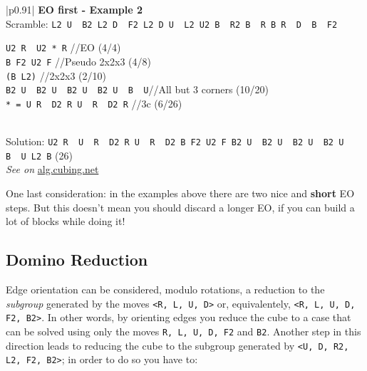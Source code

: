 \documentclass[11pt,a4paper]{book}
\newcommand{\p}{\textquotesingle}
\newcommand{\m}{\texttt}
\newcommand{\ps}{\p\,\,}
\newcommand{\comment}[1]{{\color{gray}\quad//#1}}
\begin{document}
\bigskip
\begin{tabular}{|p{}|}
\hline
\textbf{EO first - Example 2}\\
\hline
Scramble: \m{L2 U\ps B2 L2 D\ps F2 L2 D U\ps L2 U2 B\ps R2 B\ps R B R\ps D\ps B\ps F2}\\
\hline
\begin{minipage}[l]{0.650\textwidth}
\m{U2 R\ps U2 * R\p} \comment{EO (4/4)}\\
\m{B F2 U2 F} \comment{Pseudo 2x2x3 (4/8)}\\
\m{(B L2)} \comment{2x2x3 (2/10)}\\
\m{B2 U\ps B2 U\ps B2 U\ps B2 U\ps B\ps U}\comment{All but 3 corners (10/20)}\\
\m{* = U R\ps D2 R U\ps R\ps D2 R} \comment{3c (6/26)}
\end{minipage}
\begin{minipage}[c]{0.25\textwidth}

\end{minipage}\\
\hline
Solution: \m{U2 R\ps U\ps R\ps D2 R U\ps R\ps D2 B F2 U2 F B2 U\ps B2 U\ps B2 U\ps B2 U\ps B\ps U L2 B\p} (26)\\
\hline
\emph{See on }\href{https://alg.cubing.net/?setup=L2_B-_L2_U-_B2_L2_D-_F2_L2_D_U-_L2_U2_B-_R2_B-_R_B_R-_D-_B-_F2&alg=\%2F\%2FPremoves_(NISS)_added_to_the_scramble\%0AU2_R-_U2_(U_R-_D2_R_U-_R-_D2_R)_R-_\%2F\%2FEO\%0AB_F2_U2_F_\%2F\%2F2x2x3\%0AB2_U-_B2_U-_B2_U-_B2_U-_B-_U_\%2F\%2FAll_but_3_corners}{alg.cubing.net}\\
\hline
\end{tabular}
\bigskip


One last consideration: in the examples above there are two nice and \textbf{short} EO steps. But this doesn't mean you should discard a longer EO, if you can build a lot of blocks while doing it!


\subsection{Domino Reduction}
\label{subsection:eoToDR}

Edge orientation can be considered, modulo rotations, a reduction to the \emph{subgroup} generated by the moves \m{<R, L, U, D>} or, equivalentely, \m{<R, L, U, D, F2, B2>}. In other words, by orienting edges you reduce the cube to a case that can be solved using only the moves \m{R, L, U, D, F2} and \m{B2}. Another step in this direction leads to reducing the cube to the subgroup generated by \m{<U, D, R2, L2, F2, B2>}; in order to do so you have to:
\end{document}

